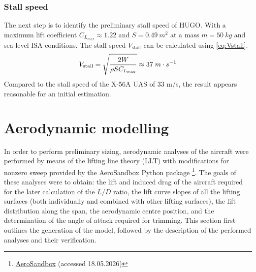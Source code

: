 \subsubsection*{Stall speed}
The next step is to identify the preliminary stall speed of HUGO. With a maximum lift coefficient $C_{L_{max}} \approx 1.22$ and $S = 0.49 \ m^2$ at a mass $m = 50 \ kg$ and sea level ISA conditions. The stall speed $V_\text{stall}$ can be calculated using \autoref{eq:Vstall}.
\begin{equation}
    V_\text{stall} = \sqrt{\frac{2W}{\rho S C_{L_\text{max}}}}\approx 37\hspace{0.1cm}m\cdot s^{-1}
    \label{eq:Vstall}
\end{equation}
Compared to the stall speed of the X-56A UAS of 33 m/s, the result appears reasonable for an initial estimation.\\

\section{Aerodynamic modelling}
\label{sec:aerodynamic_modelling}

In order to perform preliminary sizing, aerodynamic analyses of the aircraft were performed by means of the lifting line theory (LLT) with modifications for nonzero sweep provided by the AeroSandbox Python package \footnote{\href{https://aerosandbox.readthedocs.io/en/master/autoapi/aerosandbox/aerodynamics/aero_3D/lifting_line/index.html}{AeroSandbox} (accessed 18.05.2026)}. The goals of these analyses were to obtain: the lift and induced drag of the aircraft required for the later calculation of the $L/D$ ratio, the lift curve slopes of all the lifting surfaces (both individually and combined with other lifting surfaces), the lift distribution along the span, the aerodynamic centre position, and the determination of the angle of attack required for trimming. This section first outlines the generation of the model, followed by the description of the performed analyses and their verification.


